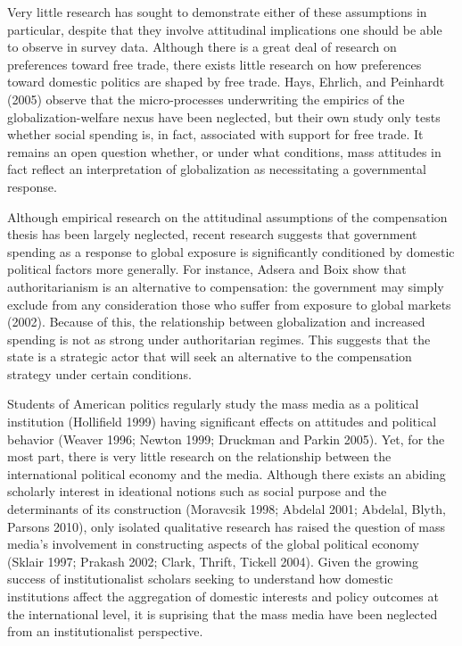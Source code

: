 \documentclass[12pt]{report}
\begin{document}
	Very little research has sought to demonstrate either of these assumptions in particular, despite that they involve attitudinal implications one should be able to observe in survey data. Although there is a great deal of research on preferences toward free trade, there exists little research on how preferences toward domestic politics are shaped by free trade. Hays, Ehrlich, and Peinhardt (2005) observe that the micro-processes underwriting the empirics of the globalization-welfare nexus have been neglected, but their own study only tests whether social spending is, in fact, associated with support for free trade. It remains an open question whether, or under what conditions, mass attitudes in fact reflect an interpretation of globalization as necessitating a governmental response.
	
	Although empirical research on the attitudinal assumptions of the compensation thesis has been largely neglected, recent research suggests that government spending as a response to global exposure is significantly conditioned by domestic political factors more generally. For instance, Adsera and Boix show that authoritarianism is an alternative to compensation: the government may simply exclude from any consideration those who suffer from exposure to global markets (2002). Because of this, the relationship between globalization and increased spending is not as strong under authoritarian regimes. This suggests that the state is a strategic actor that will seek an alternative to the compensation strategy under certain conditions. 
	
	Students of American politics regularly study the mass media as a political institution (Hollifield 1999) having significant effects on attitudes and political behavior (Weaver 1996; Newton 1999; Druckman and Parkin 2005). Yet, for the most part, there is very little research on the relationship between the international political economy and the media. Although there exists an abiding scholarly interest in ideational notions such as social purpose and the determinants of its construction (Moravcsik 1998; Abdelal 2001; Abdelal, Blyth, Parsons 2010), only isolated qualitative research has raised the question of mass media's involvement in constructing aspects of the global political economy (Sklair 1997; Prakash 2002; Clark, Thrift, Tickell 2004). Given the growing success of institutionalist scholars seeking to understand how domestic institutions affect the aggregation of domestic interests and policy outcomes at the international level, it is suprising that the mass media have been neglected from an institutionalist perspective.
	
\end{document}
